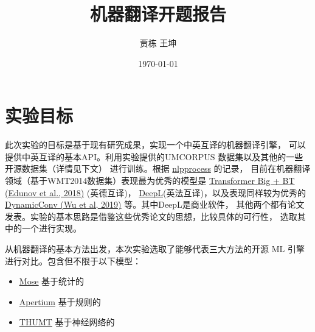 \documentclass[UTF8,a4paper,10pt]{ctexart}
\title{\textbf{机器翻译开题报告}}
\author{贾栋\; 王坤}
\date{\today}
\begin{document}
    \maketitle


\begingroup %
\color{black}%
\renewcommand{\contentsname}{目录}
\tableofcontents
\newpage
\endgroup   %
 


\section{实验目标}


此次实验的目标是基于现有研究成果，实现一个中英互译的机器翻译引擎，
可以提供中英互译的基本API。利用实验提供的UMCORPUS 数据集以及其他的一些开源数据集（详情见下文）
进行训练。根据 \href{http://nlpprogress.com/english/machine_translation.html}{\color{blue}nlpprocess} 的记录，
目前在机器翻译领域（基于WMT2014数据集）表现最为优秀的模型是 \href{https://arxiv.org/pdf/1808.09381.pdf}{\color{blue}Transformer Big + BT (Edunov et al., 2018)} (英德互译)，
\href{https://www.deepl.com/press.html}{\color{blue}DeepL}(英法互译)，以及表现同样较为优秀的 \href{https://arxiv.org/abs/1901.10430.pdf}{\color{blue}DynamicConv (Wu et al, 2019)}
等。其中DeepL是商业软件，
  其他两个都有论文发表。实验的基本思路是借鉴这些优秀论文的思想，比较具体的可行性，
  选取其中的一个进行实现。

从机器翻译的基本方法出发，本次实验选取了能够代表三大方法的开源 ML 引擎进行对比。包含但不限于以下模型：
\begin{itemize}

\item[$$$\bullet$] \href{http://www.statmt.org/moses/?n=Moses.Overview}{\color{blue}\underline{Mose}}  基于统计的 

\item[$\bullet$] \href{https://github.com/apertium}{\color{blue}\underline{Apertium}}                基于规则的

\item[$\bullet$] \href{http://thumt.thunlp.org/}{\color{blue}\underline{THUMT}}                     基于神经网络的
\end{itemize}
   
\end{document}
